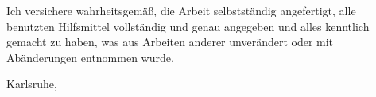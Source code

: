 \affirmation

Ich versichere wahrheitsgemäß, die Arbeit selbstständig angefertigt, alle benutzten Hilfsmittel vollständig und genau angegeben und alles kenntlich gemacht zu haben, was aus Arbeiten anderer unverändert oder mit Abänderungen entnommen wurde.

\vspace{2cm}
\begin{flushright}\noindent
    Karlsruhe,\hfill {\it \myname}\\
    \releasemonth \hfill { }
\end{flushright}
